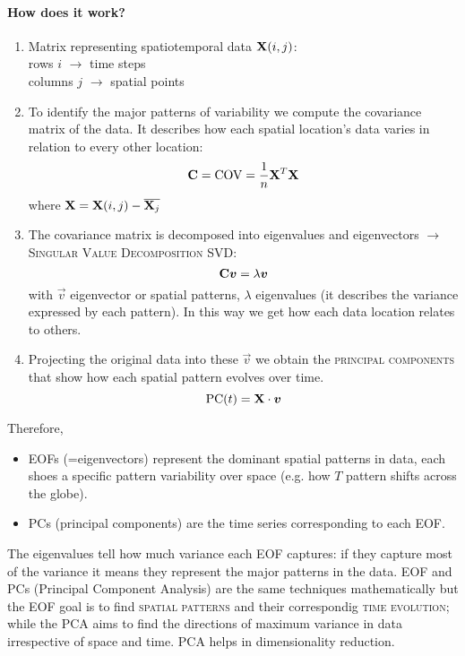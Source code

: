 \paragraph{How does it work?}
\begin{enumerate}
	\item Matrix representing spatiotemporal data $\mathbf{X}(i,j)$:\\
	      rows $i$ $\rightarrow$ time steps \\
	      columns $j$ $\rightarrow$ spatial points\\
	\item To identify the major patterns of variability we compute the covariance matrix of the data. It describes how each spatial location's data varies in relation to every other location:
	      \[\mathbf{C} = \text{COV} = \frac{1}{n} \mathbf{X}^T \mathbf{X} \]
	      where $\mathbf{X}=\mathbf{X}(i,j)-\overline{\mathbf{X}_j}$
	\item The covariance matrix is decomposed into eigenvalues and eigenvectors $\rightarrow$ \textsc{Singular Value Decomposition SVD}:
	      \[\mat{C} \vec{v}=\lambda \vec{v} \]
	      with $\vec{v}$ eigenvector or spatial patterns, $\lambda$ eigenvalues (it describes the variance expressed by each pattern). In this way we get how each data location relates to others.
	\item Projecting the original data into these $\vec{v}$ we obtain the \textsc{principal components} that show how each spatial pattern evolves over time.
	      \[ \text{PC}(t)=\mat{X}\cdot\vec{v} \]
\end{enumerate}
Therefore,
\begin{itemize}
	\item EOFs (=eigenvectors) represent the dominant spatial patterns in data, each shoes a specific pattern variability over space (e.g. how $T$ pattern shifts across the globe).
	\item PCs (principal components) are the time series corresponding to each EOF.
\end{itemize}
The eigenvalues tell how much variance each EOF captures: if they capture most of the variance it means they represent the major patterns in the data.
EOF and PCs (Principal Component Analysis) are the same techniques mathematically but the EOF goal is to find \textsc{spatial patterns} and their correspondig \textsc{time evolution}; while the PCA aims to find the directions of maximum variance in data irrespective of space and time. PCA helps in dimensionality reduction.

